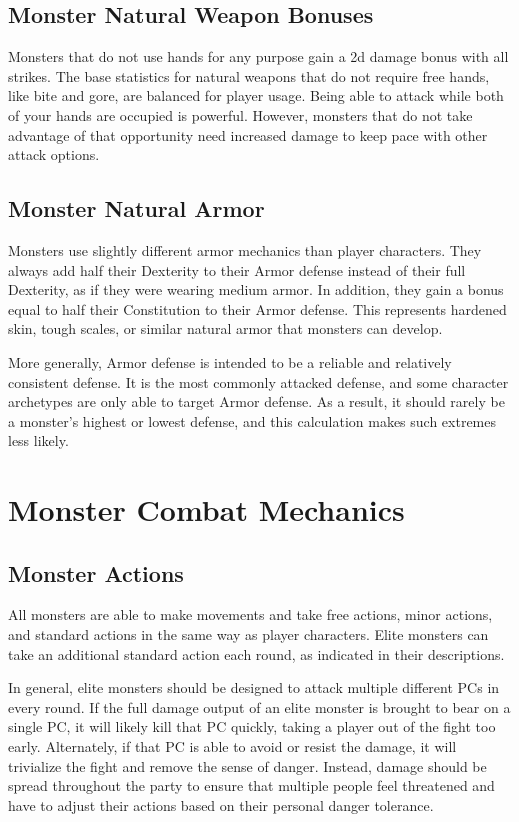     \subsection{Monster Natural Weapon Bonuses}\label{Monster Natural Weapon Bonuses}
        Monsters that do not use hands for any purpose gain a \plus2d damage bonus with all strikes.
        The base statistics for natural weapons that do not require free hands, like bite and gore, are balanced for player usage.
        Being able to attack while both of your hands are occupied is powerful.
        However, monsters that do not take advantage of that opportunity need increased damage to keep pace with other attack options.

    \subsection{Monster Natural Armor}\label{Monster Natural Armor}
        Monsters use slightly different armor mechanics than player characters.
        They always add half their Dexterity to their Armor defense instead of their full Dexterity, as if they were wearing medium armor.
        In addition, they gain a bonus equal to half their Constitution to their Armor defense.
        This represents hardened skin, tough scales, or similar natural armor that monsters can develop.

        More generally, Armor defense is intended to be a reliable and relatively consistent defense.
        It is the most commonly attacked defense, and some character archetypes are only able to target Armor defense.
        As a result, it should rarely be a monster's highest or lowest defense, and this calculation makes such extremes less likely.

\section{Monster Combat Mechanics}

    \subsection{Monster Actions}\label{Monster Actions}
        All monsters are able to make movements and take free actions, minor actions, and standard actions in the same way as player characters.
        Elite monsters can take an additional standard action each round, as indicated in their descriptions.

        In general, elite monsters should be designed to attack multiple different PCs in every round.
        If the full damage output of an elite monster is brought to bear on a single PC, it will likely kill that PC quickly, taking a player out of the fight too early.
        Alternately, if that PC is able to avoid or resist the damage, it will trivialize the fight and remove the sense of danger.
        Instead, damage should be spread throughout the party to ensure that multiple people feel threatened and have to adjust their actions based on their personal danger tolerance.

